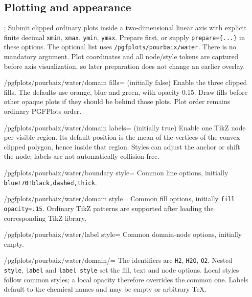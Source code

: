 \documentclass[a4paper,11pt]{ltxdoc}
\begin{document}
\subsection{Plotting and appearance}
\begin{command}{\addpourbaixwater{};}
Submit clipped ordinary plots inside a two-dimensional linear axis with explicit
finite decimal \texttt{xmin}, \texttt{xmax}, \texttt{ymin}, \texttt{ymax}.
Prepare first, or supply \texttt{prepare=\{...\}} in these options.
The optional list uses \texttt{/pgfplots/pourbaix/water}. There is no mandatory
argument. Plot coordinates and all node/style tokens are captured before axis
visualization, so later preparation does not change an earlier overlay.
\end{command}
\begin{key}{/pgfplots/pourbaix/water/domain fills= (initially false)}
Enable the three clipped fills. The defaults use orange, blue and green,
with opacity 0.15. Draw fills before other opaque plots if they should be behind
those plots. Plot order remains ordinary PGFPlots order.
\end{key}
\begin{key}{/pgfplots/pourbaix/water/domain labels= (initially true)}
Enable one TikZ node per visible region. Its default position is the mean of the
vertices of the convex clipped polygon, hence inside that region. Styles can
adjust the anchor or shift the node; labels are not automatically collision-free.
\end{key}
\begin{key}{/pgfplots/pourbaix/water/boundary style=}
Common line options, initially \texttt{blue!70!black,dashed,thick}.
\end{key}
\begin{key}{/pgfplots/pourbaix/water/domain style=}
Common fill options, initially \texttt{fill opacity=.15}. Ordinary TikZ patterns
are supported after loading the corresponding TikZ library.
\end{key}
\begin{key}{/pgfplots/pourbaix/water/label style=}
Common domain-node options, initially empty.
\end{key}
\begin{key}{/pgfplots/pourbaix/water/domain/=}
The identifiers are \texttt{H2}, \texttt{H2O}, \texttt{O2}. Nested \texttt{style},
\texttt{label} and \texttt{label style} set the fill, text and node options.
Local styles follow common styles; a local opacity therefore overrides the common
one. Labels default to the chemical names and may be empty or arbitrary TeX.
\end{key}
\end{document}
